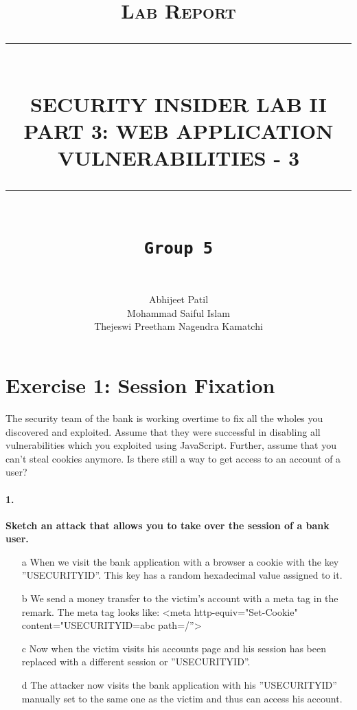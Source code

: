 \documentclass[12pt]{report}
\newcommand{\HRule}[1]{\rule{\linewidth}{#1}}
\begin{document}
	
	\title{ \normalsize \textsc{Lab Report}
		\\ [2.0cm]
		\HRule{0.5pt} \\
		\LARGE \textbf{\uppercase{Security Insider Lab II \\
				Part 3: Web Application Vulnerabilities - 3}}
		\HRule{2pt} \\ [0.5cm]
		\normalsize \vspace*{4\baselineskip}
		\LARGE {\tt Group 5}\\}
	\date{}
	\author{
		 \\
		Abhijeet Patil \\
		Mohammad Saiful Islam\\
		Thejeswi Preetham Nagendra Kamatchi}
	\maketitle
	\newpage
	
	\section*{Exercise 1: Session Fixation}
	The security team of the bank is working overtime to fix all the wholes you discovered and exploited. Assume
	that they were successful in disabling all vulnerabilities which you exploited using JavaScript. Further, assume
	that you can’t steal cookies anymore. Is there still a way to get access to an account of a user?
	
	\paragraph*{1.}{\bf Sketch an attack that allows you to take over the session of a bank user.}\\
	\begin{itemize}
	
		\item[a] When we visit the bank application with a browser a cookie with the key ''USECURITYID''. This key has a random hexadecimal value assigned to it.
		\item[b] We send a money transfer to the victim's account with a meta tag in the remark. The meta tag looks like: <meta http-equiv="Set-Cookie" content="USECURITYID=abc path=/''>
		\item[c] Now when the victim visits his accounts page and his session has been replaced with a different session or ''USECURITYID''.
		\item[d] The attacker now visits the bank application with his ''USECURITYID'' manually set to the same one as the victim and thus can access his account.
	\end{itemize}
	
\end{document}
